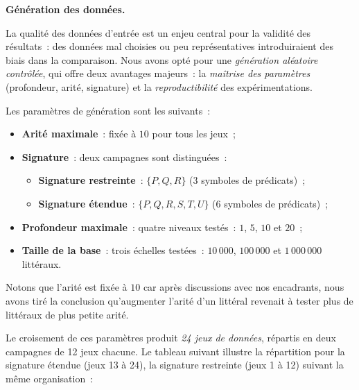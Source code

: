 \documentclass[11pt]{article}
\newenvironment{paraph}[1]{%
  \medskip
  \noindent\textbf{#1.}\quad

  \vspace{0.2cm}
}{%
  \medskip
}
\begin{document}
\begin{paraph}{Génération des données}
    La qualité des données d'entrée est un enjeu central pour la 
    validité des résultats~: des données mal choisies ou peu 
    représentatives introduiraient des biais dans la comparaison. 
    Nous avons opté pour une \textit{génération aléatoire contrôlée}, 
    qui offre deux avantages majeurs~: la \textit{maîtrise des 
    paramètres} (profondeur, arité, signature) et la 
    \textit{reproductibilité} des expérimentations.

    \vspace{0.2cm}
    Les paramètres de génération sont les suivants~:
    \begin{itemize}
        \item \textbf{Arité maximale}~: fixée à $10$ pour tous les jeux~;
        \item \textbf{Signature}~: deux campagnes sont distinguées~:
        \begin{itemize}
            \item \textbf{Signature restreinte}~: $\{P, Q, R\}$ 
            (3 symboles de prédicats)~;
            \item \textbf{Signature étendue}~: $\{P, Q, R, S, T, U\}$ 
            (6 symboles de prédicats)~;
        \end{itemize}
        \item \textbf{Profondeur maximale}~: quatre niveaux testés~: 
        $1$, $5$, $10$ et $20$~;
        \item \textbf{Taille de la base}~: trois échelles testées~: 
        $10\,000$, $100\,000$ et $1\,000\,000$ littéraux.
    \end{itemize}
    Notons que l'arité est fixée à $10$ car après discussions avec nos encadrants,
    nous avons tiré la conclusion qu'augmenter l'arité d'un littéral revenait à 
    tester plus de littéraux de plus petite arité.

    \vspace{0.2cm}
    Le croisement de ces paramètres produit \textit{24 jeux de données}, 
    répartis en deux campagnes de 12 jeux chacune. Le tableau suivant 
    illustre la répartition pour la signature étendue (jeux 13 à 24), 
    la signature restreinte (jeux 1 à 12) suivant la même organisation~:


\end{paraph}
\end{document}
